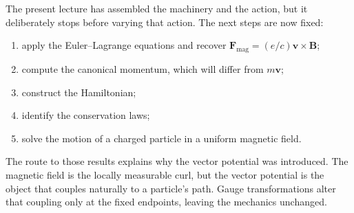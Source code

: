 The present lecture has assembled the machinery and the action, but it deliberately stops before varying that action. The next steps are now fixed:
\begin{enumerate}
  \item apply the Euler--Lagrange equations and recover
  \(\mathbf F_{\mathrm{mag}}=(e/c)\mathbf v\times\mathbf B\);
  \item compute the canonical momentum, which will differ from \(m\mathbf v\);
  \item construct the Hamiltonian;
  \item identify the conservation laws;
  \item solve the motion of a charged particle in a uniform magnetic field.
\end{enumerate}

The route to those results explains why the vector potential was introduced. The magnetic field is the locally measurable curl, but the vector potential is the object that couples naturally to a particle's path. Gauge transformations alter that coupling only at the fixed endpoints, leaving the mechanics unchanged.
